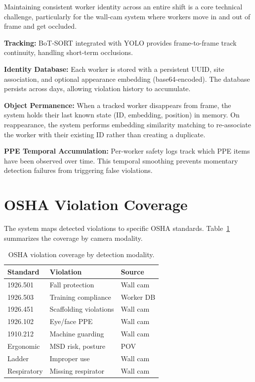 \documentclass[11pt, twocolumn]{article}
\begin{document}
Maintaining consistent worker identity across an entire shift is a core technical challenge, particularly for the wall-cam system where workers move in and out of frame and get occluded.

\textbf{Tracking:} BoT-SORT integrated with YOLO provides frame-to-frame track continuity, handling short-term occlusions.

\textbf{Identity Database:} Each worker is stored with a persistent UUID, site association, and optional appearance embedding (base64-encoded). The database persists across days, allowing violation history to accumulate.

\textbf{Object Permanence:} When a tracked worker disappears from frame, the system holds their last known state (ID, embedding, position) in memory. On reappearance, the system performs embedding similarity matching to re-associate the worker with their existing ID rather than creating a duplicate.

\textbf{PPE Temporal Accumulation:} Per-worker safety logs track which PPE items have been observed over time. This temporal smoothing prevents momentary detection failures from triggering false violations.

\section{OSHA Violation Coverage}

The system maps detected violations to specific OSHA standards. Table~\ref{tab:osha} summarizes the coverage by camera modality.

\begin{table}[H]
\centering
\small
\caption{OSHA violation coverage by detection modality.}
\label{tab:osha}
\begin{tabular}{lll}
\toprule
\textbf{Standard} & \textbf{Violation} & \textbf{Source} \\
\midrule
1926.501 & Fall protection & Wall cam \\
1926.503 & Training compliance & Worker DB \\
1926.451 & Scaffolding violations & Wall cam \\
1926.102 & Eye/face PPE & Wall cam \\
1910.212 & Machine guarding & Wall cam \\
Ergonomic & MSD risk, posture & POV \\
Ladder & Improper use & Wall cam \\
Respiratory & Missing respirator & Wall cam \\
\bottomrule
\end{tabular}
\end{table}
\end{document}
